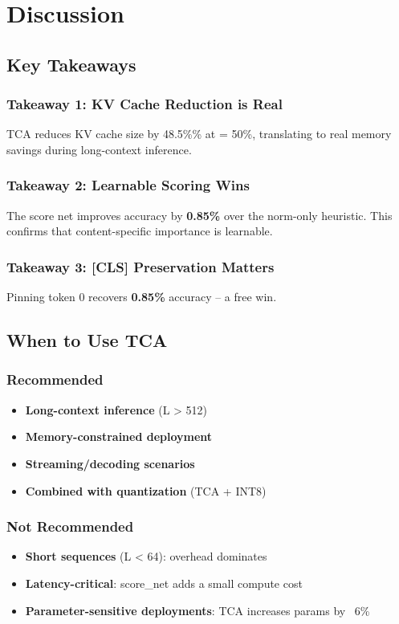 \section{Discussion}

\subsection{Key Takeaways}

\subsubsection{Takeaway 1: KV Cache Reduction is Real}

TCA reduces KV cache size by 48.5\%\% at   = 50\%, translating 
to real memory savings during long-context inference.

\subsubsection{Takeaway 2: Learnable Scoring Wins}

The score net improves accuracy by \textbf{0.85\%} over the norm-only 
heuristic. This confirms that content-specific importance is learnable.

\subsubsection{Takeaway 3: [CLS] Preservation Matters}

Pinning token 0 recovers \textbf{0.85\%} accuracy -- a free win.

\subsection{When to Use TCA}

\subsubsection{Recommended}
\begin{itemize}
\item \textbf{Long-context inference} (L \textgreater{} 512)
\item \textbf{Memory-constrained deployment}
\item \textbf{Streaming/decoding scenarios}
\item \textbf{Combined with quantization} (TCA + INT8)

\end{itemize}
\subsubsection{Not Recommended}
\begin{itemize}
\item \textbf{Short sequences} (L \textless{} 64): overhead dominates
\item \textbf{Latency-critical}: score\_net adds a small compute cost
\item \textbf{Parameter-sensitive deployments}: TCA increases params by ~6\%

\end{itemize}
